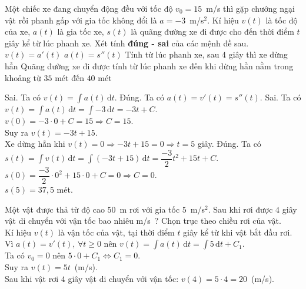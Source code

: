 \begin{ex}%
Một chiếc xe đang chuyển động đều với tốc độ $v_0=15$~m/s thì gặp chướng ngại vật rồi phanh gấp với gia tốc không đổi là $a=-3$~m/s$^2$. Kí hiệu $v(t)$ là tốc độ của xe, $a(t)$ là gia tốc xe, $s(t)$ là quãng đường xe đi được cho đến thời điểm $t$ giây kể từ lúc phanh xe. Xét tính \textbf{đúng - sai} của các mệnh đề sau.
\choiceTF
{$v(t)=a'(t)$}
{\True $a(t)=s''(t)$}
{Tính từ lúc phanh xe, sau $4$ giây thì xe dừng hẳn}
{\True Quãng đường xe đi được tính từ lúc phanh xe đến khi dừng hẳn nằm trong khoảng từ $35$ mét đến $40$ mét}
\loigiai
{
	\begin{itemchoice}
	\itemch Sai. Ta có $v(t)=\displaystyle\int a(t)\mathrm{\,d}t$.
	\itemch Đúng. Ta có $a(t)=v'(t)=s''(t)$.
	\itemch Sai. Ta có $v(t)=\displaystyle\int a(t)\mathrm{\,d}t=\displaystyle\int -3\mathrm{\,d}t=-3t+C$.\\
	$v(0)=-3\cdot 0+C=15\Rightarrow C=15$.\\
	Suy ra $ v(t)=-3t+15$.\\
	Xe dừng hẳn khi $v(t)=0\Rightarrow -3t+15=0\Rightarrow t=5$ giây.
	\itemch Đúng. Ta có $s(t)=\displaystyle\int v(t)\mathrm{\,d}t=\displaystyle\int (-3t+15)\mathrm{\,d}t=\dfrac{-3}{2}t^2+15t+C$.\\
	$s(0)=\dfrac{-3}{2}\cdot 0^2+15\cdot 0+C=0\Rightarrow C=0$.\\
	$s(5)=37{,}5$ mét.
	\end{itemchoice}
}
\end{ex}

\begin{bt}%
Một vật được thả từ độ cao $50$~m rơi với gia tốc $5$~m/s$^2$. Sau khi rơi được $4$ giây vật di chuyển với vận tốc bao nhiêu m/s~?
\loigiai
{
	Chọn trục theo chiều rơi của vật.\\
	Kí hiệu $v(t)$ là vận tốc của vật, tại thời điểm $t$ giây kể từ khi vật bắt đầu rơi.\\
	Vì $a(t)=v'(t)$, $\forall t\ge 0$ nên $v(t)=\displaystyle\int a(t)\mathrm{\,d}t=\displaystyle\int 5\mathrm{\,d}t+C_1$.\\
	Ta có $v_0=0$ nên $5\cdot0+C_1 \Leftrightarrow C_1=0$.\\
	Suy ra $v(t)=5t$~(m/s).\\
	Sau khi vật rơi $4$	giây vật di chuyển với vận tốc: $v(4)=5\cdot4=20$~(m/s).
}
\end{bt}

